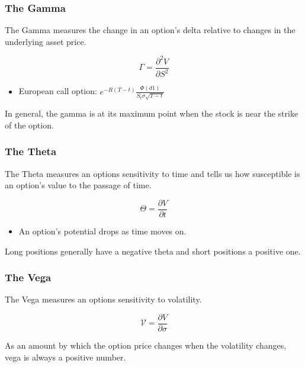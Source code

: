 \documentclass{beamer}
\begin{document}
\begin{frame}
    \frametitle{The Gamma}
    The Gamma measures the change in an option's 
    delta relative to changes in the underlying
    asset price.\pause

    \begin{block}{}
        $$
        \Gamma = \frac{\partial^2 V}{\partial S^2}
        $$
    \end{block}
    \pause
    \begin{itemize}
        \item European call option: $e^{-R(T-t)}\frac{\Phi(d1)}{S_t\sigma\sqrt{T-t}}$
    \end{itemize}
    \vspace{0.3cm}
    \pause 
    In general, the gamma is at its maximum point when the stock is near the 
    strike of the option.
\end{frame}

\begin{frame}
    \frametitle{The Theta}
    The Theta measures an options sensitivity to time 
    and tells us how susceptible is an option's value 
    to the passage of time.\pause

    \begin{block}{}
        $$
        \Theta = \frac{\partial V}{\partial t}
        $$  
    \end{block}\pause
    \vspace{0.3cm}
    \begin{itemize}
        \item An option's potential drops as time moves on. 
    \end{itemize}\pause
    \vspace{0.3cm}
    Long positions generally have a negative theta and 
    short positions a positive one.
    
\end{frame}

\begin{frame}
    \frametitle{The Vega}
    The Vega measures an options sensitivity to volatility.\pause

    \begin{block}{}
        $$ 
        \mathcal{V}  = \frac{\partial V}{\partial \sigma}
        $$  
    \end{block}\pause
    \vspace{0.3cm}
    As an amount by which the option price changes when the 
    volatility changes, vega is always a positive number.
\end{frame}
\end{document}
